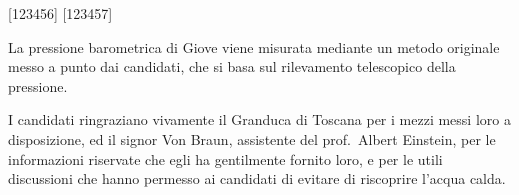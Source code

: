 \documentclass[%
,corpo=11pt
,twoside
,greek%
,cucitura
]{toptesi}
\begin{document}



\begin{frontespizio}
\FacoltaDi{}%
[123456]%
[123457]%
\end{frontespizio}

\sommario %

 La pressione barometrica di Giove viene misurata
mediante un metodo originale  messo a punto dai candidati, che si basa
sul rilevamento telescopico della pressione.


\ringraziamenti %

I candidati ringraziano vivamente il Granduca di Toscana per i mezzi
messi loro a disposizione, ed il signor Von Braun, assistente del
prof.~Albert Einstein, per le informazioni riservate che egli ha
gentilmente fornito loro, e per le utili discussioni che hanno permesso
ai candidati di evitare di riscoprire l'acqua calda.
\end{document}
